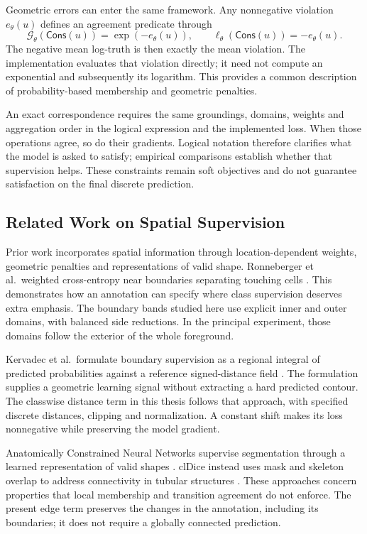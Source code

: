 \documentclass[12pt,a4paper]{article}
\begin{document}
Geometric errors can enter the same framework. Any nonnegative violation
$e_\theta(u)$ defines an agreement predicate through
\begin{equation}
\mathcal{G}_{\theta}(\mathsf{Cons}(u))=\exp(-e_{\theta}(u)),
\qquad
\ell_{\theta}(\mathsf{Cons}(u))=-e_{\theta}(u).
\label{eq:penalty-predicate}
\end{equation}
The negative mean log-truth is then exactly the mean violation. The
implementation evaluates that violation directly; it need not compute
an exponential and subsequently its logarithm. This provides a common
description of probability-based membership and geometric penalties.

An exact correspondence requires the same groundings, domains, weights
and aggregation order in the logical expression and the implemented loss.
When those operations agree, so do their gradients. Logical notation
therefore clarifies what the model is asked to satisfy; empirical
comparisons establish whether that supervision helps. These constraints
remain soft objectives and do not guarantee satisfaction on the final
discrete prediction.

\subsection{Related Work on Spatial Supervision}\label{sec:spatial-related-work}

Prior work incorporates spatial information through location-dependent
weights, geometric penalties and representations of valid shape.
Ronneberger et al.\ weighted cross-entropy near boundaries separating
touching cells \cite{ronneberger2015unet}. This demonstrates how an
annotation can specify where class supervision deserves extra emphasis.
The boundary bands studied here use explicit inner and outer domains,
with balanced side reductions. In the principal experiment, those domains
follow the exterior of the whole foreground.

Kervadec et al.\ formulate boundary supervision as a regional integral
of predicted probabilities against a reference signed-distance field
\cite{kervadec2019boundary}. The formulation supplies a geometric
learning signal without extracting a hard predicted contour. The
classwise distance term in this thesis follows that approach, with
specified discrete distances, clipping and normalization. A constant
shift makes its loss nonnegative while preserving the model gradient.

Anatomically Constrained Neural Networks supervise segmentation through
a learned representation of valid shapes \cite{oktay2017anatomically}.
clDice instead uses mask and skeleton overlap to address connectivity
in tubular structures \cite{shit2021cldice}. These approaches concern
properties that local membership and transition agreement do not enforce.
The present edge term preserves the changes in the annotation, including
its boundaries; it does not require a globally connected prediction.
\end{document}
